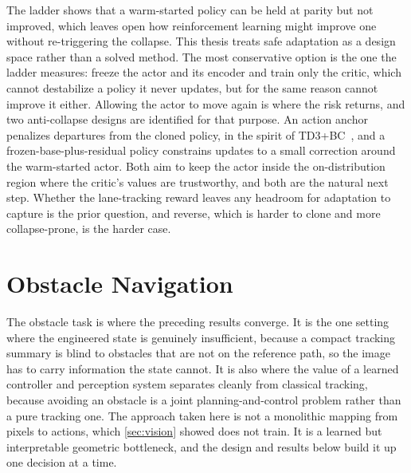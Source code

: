 The ladder shows that a warm-started policy can be held at parity but not improved, which leaves open how reinforcement learning might improve one without re-triggering the collapse. This thesis treats safe adaptation as a design space rather than a solved method. The most conservative option is the one the ladder measures: freeze the actor and its encoder and train only the critic, which cannot destabilize a policy it never updates, but for the same reason cannot improve it either. Allowing the actor to move again is where the risk returns, and two anti-collapse designs are identified for that purpose. An action anchor penalizes departures from the cloned policy, in the spirit of TD3+BC~\cite{fujimoto2021td3bc}, and a frozen-base-plus-residual policy constrains updates to a small correction around the warm-started actor. Both aim to keep the actor inside the on-distribution region where the critic's values are trustworthy, and both are the natural next step. Whether the lane-tracking reward leaves any headroom for adaptation to capture is the prior question, and reverse, which is harder to clone and more collapse-prone, is the harder case.

\section{Obstacle Navigation}
\label{sec:obstacle_results}

The obstacle task is where the preceding results converge. It is the one setting where the engineered state is genuinely insufficient, because a compact tracking summary is blind to obstacles that are not on the reference path, so the image has to carry information the state cannot. It is also where the value of a learned controller and perception system separates cleanly from classical tracking, because avoiding an obstacle is a joint planning-and-control problem rather than a pure tracking one. The approach taken here is not a monolithic mapping from pixels to actions, which \cref{sec:vision} showed does not train. It is a learned but interpretable geometric bottleneck, and the design and results below build it up one decision at a time.

